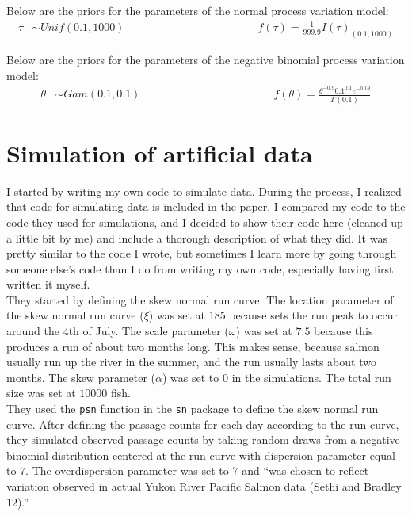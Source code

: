 \documentclass[12pt]{article}\usepackage[]{graphicx}\usepackage[]{color}
\begin{document}
\noindent Below are the priors for the parameters of the normal process variation model:
\begin{align*}
\tau &\sim Unif(0.1, 1000) \hspace{2in} f(\tau) = \frac{1}{999.9} I(\tau)_{(0.1, 1000)} 
\end{align*}

\noindent Below are the priors for the parameters of the negative binomial process variation model:
\begin{align*}
\theta &\sim Gam(0.1, 0.1) \hspace{2in} f(\theta) = \frac{\theta^{-0.9}0.1^{0.1}e^{-0.1\theta}}{\Gamma(0.1)}
\end{align*}



\section{Simulation of artificial data}

I started by writing my own code to simulate data. During the process, I realized that code for simulating data is included in the paper. I compared my code to the code they used for simulations, and I decided to show their code here (cleaned up a little bit by me) and include a thorough description of what they did. It was pretty similar to the code I wrote, but sometimes I learn more by going through someone else's code than I do from writing my own code, especially having first written it myself. \\

\noindent They started by defining the skew normal run curve. The location parameter of the skew normal run curve ($\xi$) was set at $185$ because sets the run peak to occur around the $4$th of July. The scale parameter ($\omega$) was set at $7.5$ because this produces a run of about two months long. This makes sense, because salmon usually run up the river in the summer, and the run usually lasts about two months. The skew parameter ($\alpha$) was set to $0$ in the simulations. The total run size was set at $10000$ fish.\\

They used the \verb+psn+ function in the \verb+sn+ package to define the skew normal run curve. After defining the passage counts for each day according to the run curve, they simulated observed passage counts by taking random draws from a negative binomial distribution centered at the run curve with dispersion parameter equal to $7$. The overdispersion parameter was set to $7$ and ``was chosen to reflect variation observed in actual Yukon River Pacific Salmon data (Sethi and Bradley $12$).''
\end{document}
